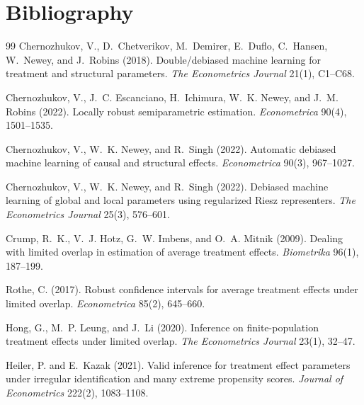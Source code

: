 \documentclass[11pt]{article}
\theoremstyle{definition}
\theoremstyle{plain}
\theoremstyle{remark}
\begin{document}
\section*{Bibliography}
\begin{thebibliography}{99}
Chernozhukov, V., D.~Chetverikov, M.~Demirer, E.~Duflo, C.~Hansen, W.~Newey, and J.~Robins (2018).
\newblock Double/debiased machine learning for treatment and structural parameters.
\newblock \emph{The Econometrics Journal} 21(1), C1--C68.

Chernozhukov, V., J.~C. Escanciano, H.~Ichimura, W.~K. Newey, and J.~M. Robins (2022).
\newblock Locally robust semiparametric estimation.
\newblock \emph{Econometrica} 90(4), 1501--1535.

Chernozhukov, V., W.~K. Newey, and R.~Singh (2022).
\newblock Automatic debiased machine learning of causal and structural effects.
\newblock \emph{Econometrica} 90(3), 967--1027.

Chernozhukov, V., W.~K. Newey, and R.~Singh (2022).
\newblock Debiased machine learning of global and local parameters using regularized Riesz representers.
\newblock \emph{The Econometrics Journal} 25(3), 576--601.

Crump, R.~K., V.~J. Hotz, G.~W. Imbens, and O.~A. Mitnik (2009).
\newblock Dealing with limited overlap in estimation of average treatment effects.
\newblock \emph{Biometrika} 96(1), 187--199.

Rothe, C. (2017).
\newblock Robust confidence intervals for average treatment effects under limited overlap.
\newblock \emph{Econometrica} 85(2), 645--660.

Hong, G., M.~P. Leung, and J.~Li (2020).
\newblock Inference on finite-population treatment effects under limited overlap.
\newblock \emph{The Econometrics Journal} 23(1), 32--47.

Heiler, P. and E.~Kazak (2021).
\newblock Valid inference for treatment effect parameters under irregular identification and many extreme propensity scores.
\newblock \emph{Journal of Econometrics} 222(2), 1083--1108.


\end{thebibliography}
\end{document}
